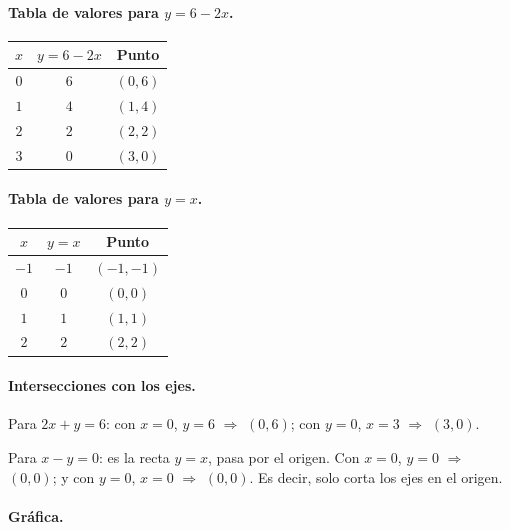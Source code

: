 \documentclass[12pt]{article}
\begin{document}
\paragraph{Tabla de valores para \(y=6-2x\).}

\begin{center}
\begin{tabular}{ccc}
\toprule
\(x\) & \(y=6-2x\) & Punto \\
\midrule
\(0\) & \(6\) & \((0,6)\) \\
\(1\) & \(4\) & \((1,4)\) \\
\(2\) & \(2\) & \((2,2)\) \\
\(3\) & \(0\) & \((3,0)\) \\
\bottomrule
\end{tabular}
\end{center}

\paragraph{Tabla de valores para \(y=x\).}

\begin{center}
\begin{tabular}{ccc}
\toprule
\(x\) & \(y=x\) & Punto \\
\midrule
\(-1\) & \(-1\) & \((-1,-1)\) \\
\(0\) & \(0\) & \((0,0)\) \\
\(1\) & \(1\) & \((1,1)\) \\
\(2\) & \(2\) & \((2,2)\) \\
\bottomrule
\end{tabular}
\end{center}

\paragraph{Intersecciones con los ejes.}

Para \(2x+y=6\): con \(x=0\), \(y=6\) \(\Rightarrow\) \((0,6)\); con \(y=0\), \(x=3\) \(\Rightarrow\) \((3,0)\).

Para \(x-y=0\): es la recta \(y=x\), pasa por el origen. Con \(x=0\), \(y=0\) \(\Rightarrow\) \((0,0)\); y con \(y=0\), \(x=0\) \(\Rightarrow\) \((0,0)\). Es decir, solo corta los ejes en el origen.

\paragraph{Gráfica.}
\end{document}
